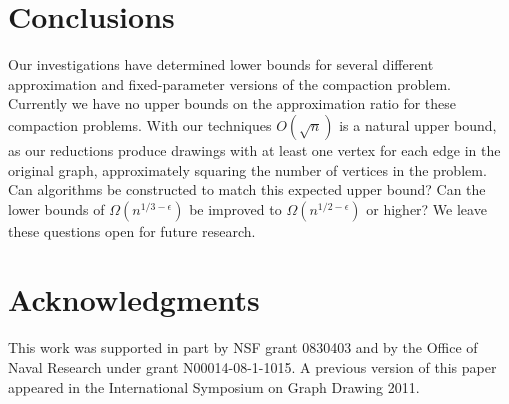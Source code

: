 \documentclass[12pt]{article}
\theoremstyle{definitions}
\begin{document}
\section{Conclusions}
Our investigations have determined lower bounds for several different approximation and fixed-parameter versions of the compaction problem. Currently we have no upper bounds on the approximation ratio for these compaction problems. With our techniques $O(\sqrt{n})$ is a natural upper bound, as our reductions produce drawings with at least one vertex for each edge in the original graph, approximately squaring the number of vertices in the problem. Can algorithms be constructed to match this expected upper bound? Can the lower bounds of $\Omega(n^{1/3-\epsilon})$ be improved to $\Omega(n^{1/2-\epsilon})$ or higher? We leave these questions open for future research.

\ifFull
\section*{Acknowledgments}
This work was supported in part by NSF grant 0830403 and by the Office of Naval Research under grant N00014-08-1-1015. A previous version of this paper appeared in the International Symposium on Graph Drawing 2011.
\fi

\raggedright


\end{document}
